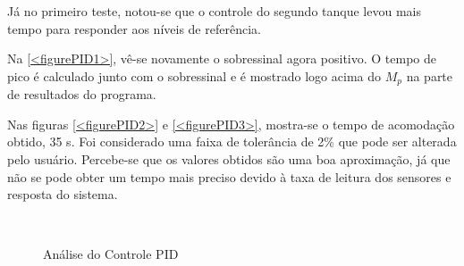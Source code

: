 \documentclass[a4paper,12pt]{article}
\begin{document}
\hspace{4ex}Já no primeiro teste, notou-se que o controle do segundo tanque levou mais tempo para responder aos níveis de referência.

\hspace{4ex}Na \ref{<figurePID1>}, vê-se novamente o sobressinal agora positivo. O tempo de pico é calculado junto com o sobressinal e é mostrado logo acima do $M_p$ na parte de resultados do programa.

\hspace{4ex}Nas figuras \ref{<figurePID2>} e \ref{<figurePID3>}, mostra-se o tempo de acomodação obtido, 35 s. Foi considerado uma faixa de tolerância de 2\% que pode ser alterada pelo usuário. Percebe-se que os valores obtidos são uma boa aproximação, já que não se pode obter um tempo mais preciso devido à taxa de leitura dos sensores e resposta do sistema.
\begin{figure}[H]
     \centering
     \hspace{4ex}
     \\
     
     \caption{Análise do Controle PID}
     \label{controlePID}
\end{figure}
\end{document}
